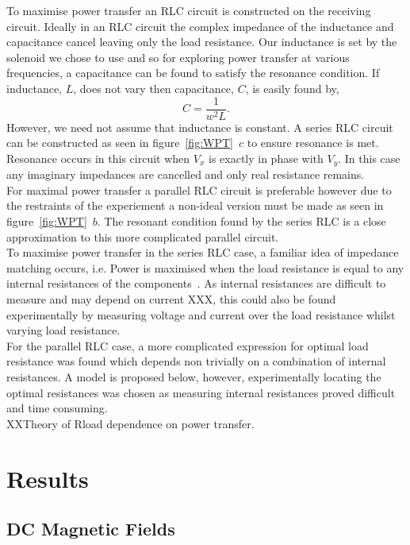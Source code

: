 \documentclass[11pt]{iopart}
\begin{document}
To maximise power transfer an RLC circuit is constructed on the
receiving circuit. Ideally in an RLC circuit the complex impedance of
the inductance and capacitance cancel leaving only the load
resistance. Our inductance is set by the solenoid we chose to use and
so for exploring power transfer at various frequencies, a capacitance
can be found to satisfy the resonance condition. If inductance, $L$,
does not vary then capacitance, $C$, is easily found by,
\begin{equation}
  C = \frac{1}{w^2L}.
\end{equation}
However, we need not assume that inductance is constant. A series RLC
circuit can be constructed as seen in figure~\ref{fig:WPT}~$c$ to
ensure resonance is met. Resonance occurs in this circuit when $V_x$
is exactly in phase with $V_y$. In this case any imaginary impedances
are cancelled and only real resistance remains. \\ For maximal power
transfer a parallel RLC circuit is preferable however due to the
restraints of the experiement a non-ideal version must be made as seen
in figure~\ref{fig:WPT}~$b$. The resonant condition found by the
series RLC is a close approximation to this more complicated parallel
circuit. \\
To maximise power transfer in the series RLC case, a familiar idea of
impedance matching occurs, i.e. Power is maximised when the load
resistance is equal to any internal resistances of the
components~\cite{XXX}. As internal resistances are difficult to
measure and may depend on current XXX, this could also be found
experimentally by measuring voltage and current over the load
resistance whilst varying load resistance. \\ For the parallel RLC
case, a more complicated expression for optimal load resistance was
found which depends non trivially on a combination of internal
resistances. A model is proposed below, however, experimentally
locating the optimal resistances was chosen as measuring internal
resistances proved difficult and time consuming.\\
XXTheory of Rload dependence on power transfer. \\


\section{Results}
\subsection{DC Magnetic Fields}
\end{document}
